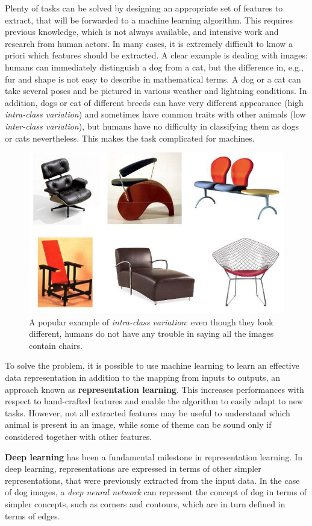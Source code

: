 \documentclass[%
    corpo=12pt,
    twoside,
    stile=classica,   
    tipotesi=magistrale,
    evenboxes,
    english,
	numerazioneromana,
]{toptesi}
\begin{document}
\medskip
Plenty of tasks can be solved by designing an appropriate set of features to extract, that will be forwarded to a machine learning algorithm. This requires previous knowledge, which is not always available, and intensive work and research from human actors. In many cases, it is extremely difficult to know a priori which features should be extracted. A clear example is dealing with images: humans can immediately distinguish a dog from a cat, but the difference in, e.g., fur and shape is not easy to describe in mathematical terms. A dog or a cat can take several poses and be pictured in various weather and lightning conditions. In addition, dogs or cat of different breeds can have very different appearance (high \textit{intra-class variation}) and sometimes have common traits with other animals (low \textit{inter-class variation}), but humans have no difficulty in classifying them as dogs or cats nevertheless. This makes the task complicated for machines.

\begin{figure}[ht]
	\centering
	\includegraphics[width=.7\linewidth]{imgs/chairs.png}
	\caption{A popular example of \textit{intra-class variation}: even though they look different, humans do not have any trouble in saying all the images contain chairs.}
	\label{fig:intraclass}
\end{figure}

To solve the problem, it is possible to use machine learning to learn an effective data representation in addition to the mapping from inputs to outputs, an approach known as \textbf{representation learning}. This increases performances with respect to hand-crafted features and enable the algorithm to easily adapt to new tasks. However, not all extracted features may be useful to understand which animal is present in an image, while some of theme can be sound only if considered together with other features.

\bigskip
\textbf{Deep learning} has been a fundamental milestone in representation learning. In deep learning, representations are expressed in terms of other simpler representations, that were previously extracted from the input data. In the case of dog images, a \textit{deep neural network} can represent the concept of dog in terms of simpler concepts, such as corners and contours, which are in turn defined in terms of edges.
\end{document}

